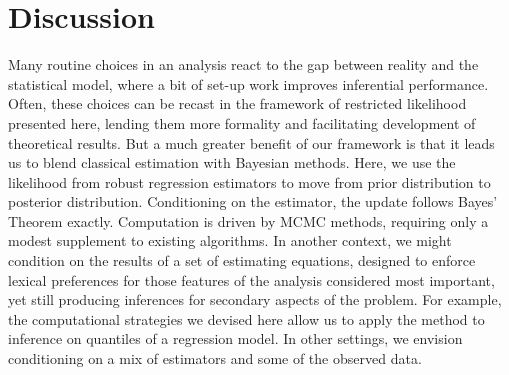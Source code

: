 \documentclass[ba]{imsart}
\begin{document}
%

\section{Discussion}
\label{Conclusions}

Many routine choices in an analysis react to the gap between reality and the
statistical model, where a bit of set-up work improves inferential
performance.  Often, these choices can be recast in the framework of
restricted likelihood presented here, lending them more formality and facilitating
development of theoretical results.  But a much greater benefit of our
framework is that it leads us to blend classical estimation with
Bayesian methods.  Here, we use the likelihood from robust regression
estimators to move from prior distribution to posterior distribution.
Conditioning on the estimator, the update follows Bayes' Theorem
exactly.   Computation is driven by MCMC methods, requiring only a modest supplement to existing algorithms.  In another context, we might condition on the results of a set of estimating equations, designed to enforce lexical preferences for those features of the analysis considered most important, yet still producing inferences for secondary aspects of the problem. For example, the computational strategies we devised here allow us to apply the method to inference on quantiles of a regression model. In other settings, we envision conditioning on a mix of estimators and some of the observed data.  
\end{document}
